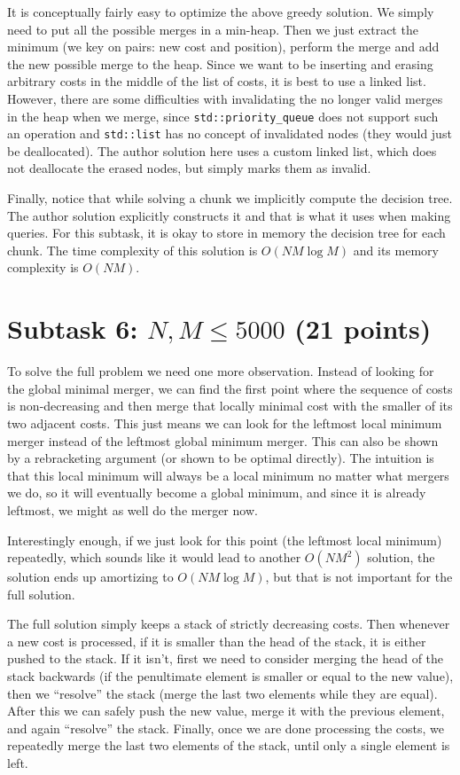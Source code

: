 \documentclass[12pt]{article}
\begin{document}
It is conceptually fairly easy to optimize the above greedy solution. We simply need to put all the possible merges in a min-heap. Then we just extract the minimum (we key on pairs: new cost and position), perform the merge and add the new possible merge to the heap. Since we want to be inserting and erasing arbitrary costs in the middle of the list of costs, it is best to use a linked list. However, there are some difficulties with invalidating the no longer valid merges in the heap when we merge, since \verb|std::priority_queue| does not support such an operation and \verb|std::list| has no concept of invalidated nodes (they would just be deallocated). The author solution here uses a custom linked list, which does not deallocate the erased nodes, but simply marks them as invalid.

Finally, notice that while solving a chunk we implicitly compute the decision tree. The author solution explicitly constructs it and that is what it uses when making queries. For this subtask, it is okay to store in memory the decision tree for each chunk. The time complexity of this solution is $O(NM \log M)$ and its memory complexity is $O(NM)$.

\section*{Subtask 6: $N, M \leq 5000$ (21 points)}

To solve the full problem we need one more observation. Instead of looking for the global minimal merger, we can find the first point where the sequence of costs is non-decreasing and then merge that locally minimal cost with the smaller of its two adjacent costs. This just means we can look for the leftmost local minimum merger instead of the leftmost global minimum merger. This can also be shown by a rebracketing argument (or shown to be optimal directly). The intuition is that this local minimum will always be a local minimum no matter what mergers we do, so it will eventually become a global minimum, and since it is already leftmost, we might as well do the merger now.

Interestingly enough, if we just look for this point (the leftmost local minimum) repeatedly, which sounds like it would lead to another $O(NM^2)$ solution, the solution ends up amortizing to $O(NM \log M)$, but that is not important for the full solution.

The full solution simply keeps a stack of strictly decreasing costs. Then whenever a new cost is processed, if it is smaller than the head of the stack, it is either pushed to the stack. If it isn't, first we need to consider merging the head of the stack backwards (if the penultimate element is smaller or equal to the new value), then we ``resolve'' the stack (merge the last two elements while they are equal). After this we can safely push the new value, merge it with the previous element, and again ``resolve'' the stack. Finally, once we are done processing the costs, we repeatedly merge the last two elements of the stack, until only a single element is left. 
\end{document}

